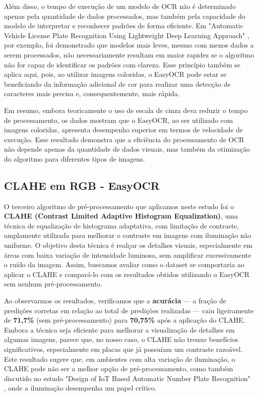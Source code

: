 \documentclass[conference]{IEEEtran}
\begin{document}
Além disso, o tempo de execução de um modelo de OCR não é determinado apenas pela quantidade de dados processados, mas também pela capacidade do modelo de interpretar e reconhecer padrões de forma eficiente. Em "Automatic Vehicle License Plate Recognition Using Lightweight Deep Learning Approach" \cite{b5}, por exemplo, foi demonstrado que modelos mais leves, mesmo com menos dados a serem processados, não necessariamente resultam em maior rapidez se o algoritmo não for capaz de identificar os padrões com clareza. Esse princípio também se aplica aqui, pois, ao utilizar imagens coloridas, o EasyOCR pode estar se beneficiando da informação adicional de cor para realizar uma detecção de caracteres mais precisa e, consequentemente, mais rápida.

Em resumo, embora teoricamente o uso de escala de cinza deva reduzir o tempo de processamento, os dados mostram que o EasyOCR, ao ser utilizado com imagens coloridas, apresenta desempenho superior em termos de velocidade de execução. Esse resultado demonstra que a eficiência do processamento de OCR não depende apenas da quantidade de dados visuais, mas também da otimização do algoritmo para diferentes tipos de imagens.

\subsection{CLAHE em RGB - EasyOCR}

O terceiro algoritmo de pré-processamento que aplicamos neste estudo foi o \textbf{CLAHE (Contrast Limited Adaptive Histogram Equalization)}, uma técnica de equalização de histograma adaptativa, com limitação de contraste, amplamente utilizada para melhorar o contraste em imagens com iluminação não uniforme. O objetivo desta técnica é realçar os detalhes visuais, especialmente em áreas com baixa variação de intensidade luminosa, sem amplificar excessivamente o ruído da imagem. Assim, buscamos avaliar como o dataset se comportaria ao aplicar o CLAHE e compará-lo com os resultados obtidos utilizando o EasyOCR sem nenhum pré-processamento.

Ao observarmos os resultados, verificamos que a \textbf{acurácia} — a fração de predições corretas em relação ao total de predições realizadas — caiu ligeiramente de \textbf{71,7\%} (sem pré-processamento) para \textbf{70,75\%} após a aplicação do CLAHE. Embora a técnica seja eficiente para melhorar a visualização de detalhes em algumas imagens, parece que, no nosso caso, o CLAHE não trouxe benefícios significativos, especialmente em placas que já possuíam um contraste razoável. Este resultado sugere que, em ambientes com alta variação de iluminação, o CLAHE pode não ser a melhor opção de pré-processamento, como também discutido no estudo "Design of IoT Based Automatic Number Plate Recognition" \cite{b10}, onde a iluminação desempenha um papel crítico.
\end{document}
